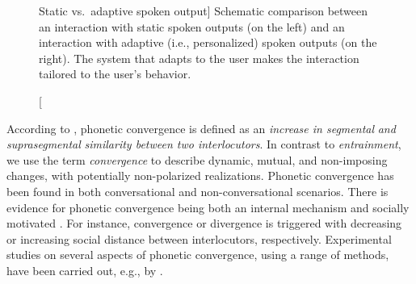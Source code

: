 \begin{figure}[t]
	\centering
	\hfill %
	\caption
	[Static vs.\ adaptive spoken output]
	{Schematic comparison between an interaction with static spoken outputs (on the left) and an interaction with adaptive (i.e., personalized) spoken outputs (on the right).
		The system that adapts to the user makes the interaction tailored to the user's behavior.}
	\label{fig:output_comparison}
\end{figure}


According to \citet{Pardo2006phonetic}, phonetic convergence is defined as an \emph{increase in segmental} \citep[e.g.,][]{Pardo2010conversational, Smith2007prosodic} \emph{and suprasegmental} \citep[e.g.,][]{Walker2015repeat, Shockley2004imitation} \emph{similarity between two interlocutors}.
In contrast to \emph{entrainment}, we use the term \emph{convergence} to describe dynamic, mutual, and non-imposing changes, with potentially non-polarized realizations.
Phonetic convergence has been found in both conversational \citep{Pardo2006phonetic, Lewandowski2012talent} and non-conversational \citep{Babel2014novelty, Shockley2004imitation} scenarios.
There is evidence for phonetic convergence being both an internal mechanism \citep{Pickering2004behavioral} and socially motivated \citep{Kim2011phonetic, Giles1991CAT}.
For instance, convergence \citep{Giles1973mobility} or divergence \citep{Bourhis1977distinctiveness} is triggered with decreasing or increasing social distance between interlocutors, respectively.
Experimental studies on several aspects of phonetic convergence, using a range of methods, have been carried out, e.g., by \citet{Pardo2013measuring, Nielsen2011specificity, Shockley2004imitation}.

